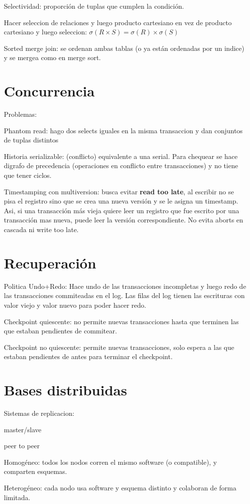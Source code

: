 Selectividad: proporción de tuplas que cumplen la condición.

Hacer seleccion de relaciones y luego producto cartesiano en vez de producto cartesiano y luego seleccion: $\sigma(R \times S) = \sigma(R) \times \sigma(S)$

Sorted merge join: se ordenan ambas tablas (o ya están ordenadas por un indice) y se mergea como en merge sort.

\section{Concurrencia}

Problemas:

Phantom read: hago dos selects iguales en la misma transaccion y dan conjuntos de tuplas distintos

Historia serializable: (conflicto) equivalente a una serial. Para chequear se hace digrafo de precedencia (operaciones en conflicto entre transacciones) y no tiene que tener ciclos.

Timestamping con multiversion: busca evitar \textbf{read too late}, al escribir no se pisa el registro sino que se crea una nueva versión y se le asigna un timestamp. Asi, si una transacción más vieja quiere leer un registro que fue escrito por una transacción mas nueva, puede leer la versión correspondiente. No evita aborts en cascada ni write too late.

\section{Recuperación}

Politica Undo+Redo: Hace undo de las transacciones incompletas y luego redo de las transacciones commiteadas en el log. Las filas del log tienen las escrituras con valor viejo y valor nuevo para poder hacer redo.

Checkpoint quiescente: no permite nuevas transacciones hasta que terminen las que estaban pendientes de commitear.

Checkpoint no quiescente: permite nuevas transacciones, solo espera a las que estaban pendientes de antes para terminar el checkpoint.

\section{Bases distribuidas}

Sistemas de replicacion:

master/slave

peer to peer

Homogéneo: todos los nodos corren el mismo software (o compatible), y comparten esquemas.

Heterogéneo: cada nodo usa software y esquema distinto y colaboran de forma limitada.
